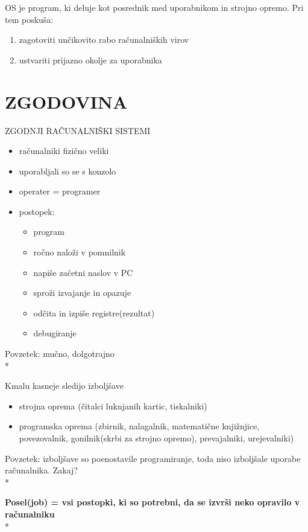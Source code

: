 \documentclass{article}
\begin{document}
OS je program, ki deluje kot posrednik med uporabnikom in strojno opremo. Pri tem poskuša:
\begin{enumerate}
  \item zagotoviti unčikovito rabo računalniških virov
  \item ustvariti prijazno okolje za uporabnika
\end{enumerate}

\section{ZGODOVINA}

ZGODNJI RAČUNALNIŠKI SISTEMI
\begin{itemize}
  \item računalniki fizično veliki
  \item uporabljali so se s konzolo
  \item operater = programer
  \item postopek:	
    \begin{itemize}
      \item program
      \item ročno naloži v pomnilnik
      \item napiše začetni naslov v PC
      \item sproži izvajanje in opazuje
      \item odčita in izpiše registre(rezultat)
      \item debugiranje
    \end{itemize}
  				
\end{itemize}

Povzetek: mučno, dolgotrajno\\*

Kmalu kasneje sledijo izboljšave
\begin{itemize}
  \item strojna oprema (čitalci luknjanih kartic, tiskalniki)
  \item programska oprema (zbirnik, nalagalnik, matematične knjižnjice, povezovalnik, gonilnik(skrbi za strojno opremo), prevajalniki, urejevalniki)
\end{itemize}

Povzetek: izboljšave so poenostavile programiranje, toda niso izboljšale uporabe računalnika. Zakaj?\\*

\textbf{Posel(job) = vsi postopki, ki so potrebni, da se izvrši neko opravilo v računalniku}\\*
\end{document}
